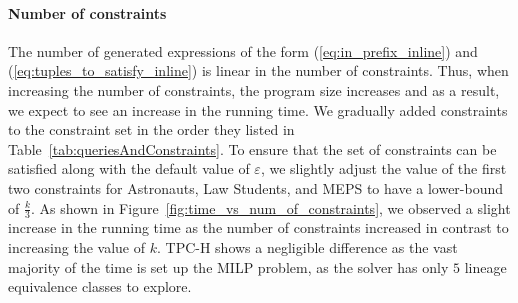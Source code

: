 \paragraph*{Number of constraints}
The number of generated expressions of the form (\ref{eq:in_prefix_inline}) and (\ref{eq:tuples_to_satisfy_inline}) is linear in the number of constraints. Thus, when increasing the number of constraints, the program size increases and as a result, we expect to see an increase in the running time.
We gradually added constraints to the constraint set in the order they listed in Table~\ref{tab:queriesAndConstraints}. To ensure that the set of constraints can be satisfied along with the default value of $\varepsilon$, we slightly adjust the value of the first two constraints for Astronauts, Law Students, and MEPS to have a lower-bound of $\frac{k}{3}$. As shown in Figure~\ref{fig:time_vs_num_of_constraints}, we observed a slight increase in the running time as the number of constraints increased in contrast to increasing the value of $k$. 
TPC-H  shows a negligible difference as the vast majority of the time is set up the MILP problem, as the solver has only $5$ lineage equivalence classes to explore.

